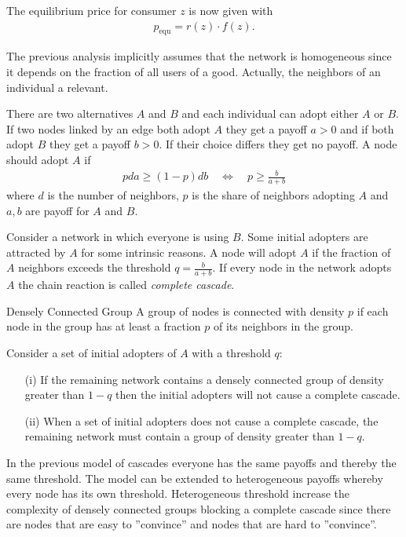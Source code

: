 \documentclass[english]{panikzettel}
\begin{document}
The equilibrium price for consumer $ z $ is now given with
\begin{align*}
	p_\text{equ} = r(z) \cdot f(z).
\end{align*}


The previous analysis implicitly assumes that the network is homogeneous since it depends on the fraction of all users of a good.
Actually, the neighbors of an individual a relevant.

There are two alternatives $ A $ and $ B $ and each individual can adopt either $ A $ or $ B $.
If two nodes linked by an edge both adopt $ A $ they get a payoff $ a > 0 $ and if both adopt $ B $ they get a payoff $ b > 0 $.
If their choice differs they get no payoff. A node should adopt $ A $ if
\begin{align*}
	pda \geq (1 - p)db \quad\Leftrightarrow\quad p \geq \frac{b}{a + b}
\end{align*}
where $ d $ is the number of neighbors, $ p $ is the share of neighbors adopting $ A $ and $ a,b $ are payoff for $ A $ and $ B $.

Consider a network in which everyone is using $ B $.
Some initial adopters are attracted by $ A $ for some intrinsic reasons.
A node will adopt $ A $ if the fraction of $ A $ neighbors exceeds the threshold $ q = \frac{b}{a + b} $.
If every node in the network adopts $ A $ the chain reaction is called \emph{complete cascade}.


\begin{defi}{Densely Connected Group}
A group of nodes is connected with density $ p $ if each node in the group has at least a fraction $ p $ of its neighbors in the group.
\end{defi}

Consider a set of initial adopters of $ A $ with a threshold $ q $:
\begin{itemize}
	\item[(i)] If the remaining network contains a densely connected group of density greater than $ 1 - q $ then the initial adopters will not cause a complete cascade.
	\item[(ii)] When a set of initial adopters does not cause a complete cascade, the remaining network must contain a group of density greater than $ 1 - q $.
\end{itemize}

In the previous model of cascades everyone has the same payoffs and thereby the same threshold.
The model can be extended to heterogeneous payoffs whereby every node has its own threshold.
Heterogeneous threshold increase the complexity of densely connected groups blocking a complete cascade since there are nodes that are easy to ''convince'' and nodes that are hard to ''convince''.
\end{document}
